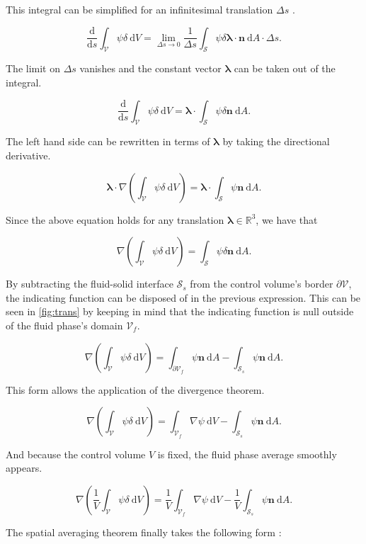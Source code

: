 \documentclass[a4paper,11pt]{article}
\begin{document}
This integral can be simplified for an infinitesimal translation
$\Delta s$ \citep{SteinBarcellos1992}.

$$\frac{\mathrm d}{\mathrm d s}\int_{\mathcal V}\psi\delta~\mathrm dV = \lim_{\Delta s\to 0}\frac{1}{\Delta s}\int_{\mathcal S}\psi\delta\bm\lambda\cdot\bm n~\mathrm dA\cdot \Delta s.$$

The limit on $\Delta s$ vanishes and the constant vector $\bm\lambda$ can be taken out of the integral.

$$\frac{\mathrm d}{\mathrm d s}\int_{\mathcal V}\psi\delta~\mathrm dV = \bm\lambda\cdot\int_{\mathcal S}\psi\delta\bm n~\mathrm dA.$$

The left hand side can be rewritten in terms of $\bm\lambda$ by taking the directional derivative.

$$\bm\lambda\cdot\nabla\left(\int_{\mathcal V}\psi\delta~\mathrm dV\right) = \bm\lambda\cdot\int_{\mathcal S}\psi\bm n~\mathrm dA.$$

Since the above equation holds for any translation $\bm\lambda\in\mathbb R^3$, we have that

$$\nabla\left(\int_{\mathcal V}\psi\delta~\mathrm dV\right) = \int_{\mathcal S}\psi\delta\bm n~\mathrm dA.$$

By subtracting the fluid-solid interface $\mathcal S_s$ from the control volume's border $\partial\mathcal V$, the indicating function can be disposed of in the previous expression.
This can be seen in \autoref{fig:trans} by keeping in mind that the indicating function is null outside of the fluid phase's domain $\mathcal V_f$.

$$\nabla\left(\int_{\mathcal V}\psi\delta~\mathrm dV\right) = \int_{\partial\mathcal V_f}\psi\bm n~\mathrm dA - \int_{\mathcal S_s}\psi\bm n~\mathrm dA.$$

This form allows the application of the divergence theorem.

$$\nabla\left(\int_{\mathcal V}\psi\delta~\mathrm dV\right) = \int_{\mathcal V_f}\nabla\psi~\mathrm dV - \int_{\mathcal S_s}\psi\bm n~\mathrm dA.$$

And because the control volume $V$ is fixed, the fluid phase average smoothly appears.

$$\nabla\left(\frac{1}{V}\int_{\mathcal V}\psi\delta~\mathrm dV\right) = \frac{1}{V}\int_{\mathcal V_f}\nabla\psi~\mathrm dV - \frac{1}{V}\int_{\mathcal S_s}\psi\bm n~\mathrm dA.$$

The spatial averaging theorem finally takes the following form :
\end{document}

